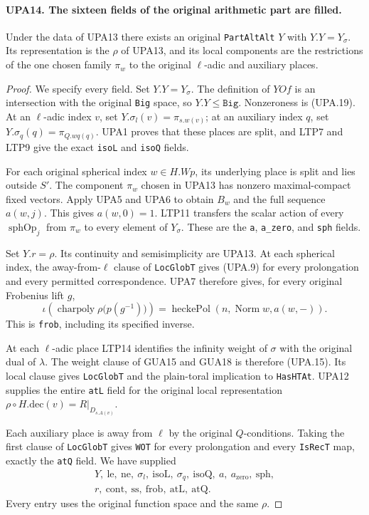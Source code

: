 \paragraph{UPA14. The sixteen fields of the original arithmetic part are filled.}
\label{claim:UPA14}
Under the data of UPA13 there exists an original
\texttt{PartAltAlt} $Y$ with $Y.Y=Y_\sigma$.
Its representation is the $\rho$ of UPA13, and its local
components are the restrictions of the one chosen family
$\pi_w$ to the original $\ell$-adic and auxiliary places.
\begin{proof}
We specify every field.
Set $Y.Y=Y_\sigma$.  The definition of $YOf$ is an
intersection with the original \texttt{Big} space, so
$Y.Y\leq\texttt{Big}$.  Nonzeroness is (UPA.19).
At an $\ell$-adic index $v$, set
$Y.\sigma_l(v)=\pi_{s.w(v)}$; at an auxiliary index $q$,
set $Y.\sigma_q(q)=\pi_{Q.wq(q)}$.
UPA1 proves that these places are split, and
LTP7 and LTP9 give the exact
\texttt{isoL} and \texttt{isoQ} fields.

For each original spherical index $w\in H.Wp$, its
underlying place is split and lies outside $S'$.
The component $\pi_w$ chosen in UPA13 has nonzero
maximal-compact fixed vectors.  Apply UPA5 and UPA6
to obtain $B_w$ and the full sequence $a(w,j)$.
This gives $a(w,0)=1$.  LTP11
transfers the scalar action of every
$\operatorname{sphOp}_j$ from $\pi_w$ to every element
of $Y_\sigma$.  These are the \texttt{a},
\texttt{a\_zero}, and \texttt{sph} fields.

Set $Y.r=\rho$.  Its continuity and semisimplicity
are UPA13.  At each spherical index, the away-from-$\ell$
clause of \texttt{LocGlobT} gives (UPA.9) for every
prolongation and every permitted correspondence.
UPA7 therefore gives, for every original Frobenius lift $g$,
\[
 \iota\!\left(\operatorname{charpoly}
                  \rho\bigl(p(g^{-1})\bigr)\right)
       =\operatorname{heckePol}(n,\operatorname{Norm}w,a(w,-)).
 \tag{UPA.20}
\]
This is \texttt{frob}, including its specified inverse.

At each $\ell$-adic place LTP14
identifies the infinity weight of $\sigma$
with the original dual of $\lambda$.  The weight clause
of GUA15 and GUA18 is therefore (UPA.15).
Its local clause gives \texttt{LocGlobT} and the
plain-toral implication to \texttt{HasHTAt}.
UPA12 supplies the entire \texttt{atL} field for
the original local representation
$\rho\circ H.\mathrm{dec}(v)=R|_{D_{s.A(v)}}$.

Each auxiliary place is away from $\ell$ by the original
$Q$-conditions.  Taking the first clause of
\texttt{LocGlobT} gives \texttt{WOT} for every
prolongation and every \texttt{IsRecT} map, exactly
the \texttt{atQ} field.
We have supplied
\[
\begin{gathered}
Y,\ \mathrm{le},\ \mathrm{ne},\
\sigma_l,\ \mathrm{isoL},\
\sigma_q,\ \mathrm{isoQ},\
a,\ a_{\mathrm{zero}},\ \mathrm{sph},\\
r,\ \mathrm{cont},\ \mathrm{ss},\
\mathrm{frob},\ \mathrm{atL},\ \mathrm{atQ}.
\end{gathered}
\]
Every entry uses the original function space and the same $\rho$.
\end{proof}


